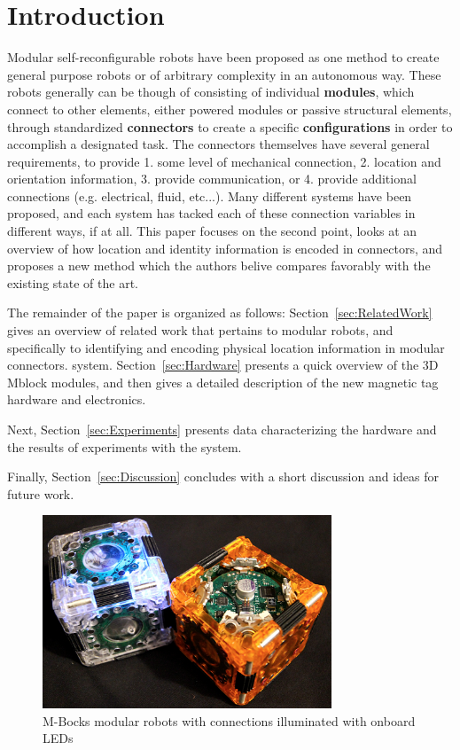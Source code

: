 \section{Introduction}
\label{sec:Introduction}

Modular self-reconfigurable robots have been proposed as one method to create general purpose robots or of arbitrary complexity in an autonomous way. These robots generally can be though of consisting of individual \textbf{modules}, which connect to other elements, either powered modules or passive structural elements, through standardized \textbf{connectors} to create a specific \textbf{configurations} in order to accomplish a designated task. The connectors themselves have several general requirements, to provide 1. some level of mechanical connection, 2. location and orientation information, 3. provide communication, or 4. provide additional connections (e.g. electrical, fluid, etc...). Many different systems have been proposed, and each system has tacked each of these connection variables in different ways, if at all. This paper focuses on the second point, looks at an overview of how location and identity information is encoded in connectors, and proposes a new method which the authors belive compares favorably with the existing state of the art.
	
The remainder of the paper is organized as follows: 
Section~\ref{sec:RelatedWork} gives an overview of related
work that pertains to modular robots, and specifically to identifying and encoding physical location information in modular connectors.
system. 
Section~\ref{sec:Hardware} presents a quick overview of the 3D Mblock modules, and then gives a detailed description of the new magnetic tag hardware and electronics.


Next, Section~\ref{sec:Experiments}
presents data characterizing the hardware and the results of
experiments with the system. 

Finally, Section~\ref{sec:Discussion}
concludes with a short discussion and ideas for future work.

\begin{figure}[htb]  

  \centering
  \includegraphics[width=3.4in]{Figures/cover.png}

  \caption{M-Bocks modular robots with connections illuminated with onboard LEDs}
    
  \label{fig:cover}    
\end{figure}